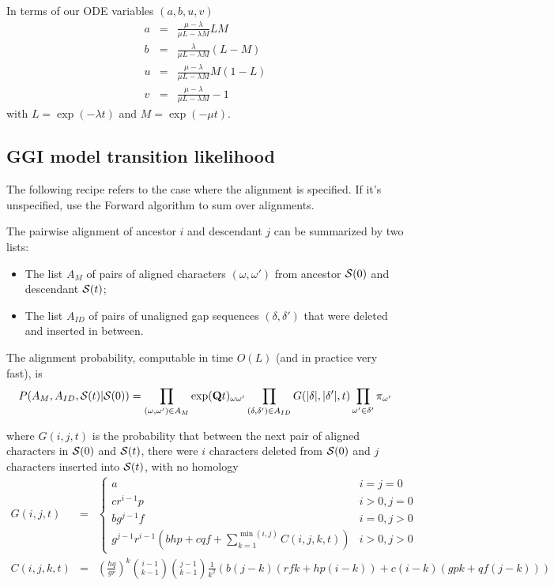 \documentclass{article}
\begin{document}
In terms of our ODE variables $(a,b,u,v)$
\begin{eqnarray*}
  a & = & \frac{\mu - \lambda}{\mu L - \lambda M} LM \\
  b & = & \frac{\lambda}{\mu L - \lambda M} (L - M) \\
  u & = & \frac{\mu - \lambda}{\mu L - \lambda M} M(1-L) \\
  v & = & \frac{\mu - \lambda}{\mu L - \lambda M} - 1
\end{eqnarray*}
with $L=\exp(-\lambda t)$ and $M=\exp(-\mu t)$.


\subsection{GGI model transition likelihood}

The following recipe refers to the case where the alignment is specified.
If it's unspecified, use the Forward algorithm to sum over alignments.

The pairwise alignment of ancestor $i$ and descendant $j$ can be summarized by two lists:
\begin{itemize}
    \item The list $A_M$ of pairs of aligned characters $(\omega,\omega')$ from ancestor ${\cal S}(0)$ and descendant ${\cal S}(t)$;
    \item The list $A_{ID}$ of pairs of unaligned gap sequences $(\delta,\delta')$ that were deleted and inserted in between.
\end{itemize}

The alignment probability, computable in time $O(L)$ (and in practice very fast), is
\[
P(A_M,A_{ID},{\cal S}(t)|{\cal S}(0)) =
\prod_{(\omega,\omega') \in A_M} \exp({\bf Q}t)_{\omega \omega'}
\prod_{(\delta,\delta') \in A_{ID}} G(|\delta|,|\delta'|,t)
\prod_{\omega'\in \delta'} \pi_{\omega'}
\]

where $G(i,j,t)$ is the probability that between the next pair of aligned characters in ${\cal S}(0)$ and ${\cal S}(t)$,
there were $i$ characters deleted from ${\cal S}(0)$ 
and $j$ characters inserted into ${\cal S}(t)$,
with no homology
\begin{eqnarray*}
G(i,j,t) & = &
\left\{ \begin{array}{ll}
a & i=j=0 \\
cr^{i-1}p & i>0, j=0 \\
bg^{j-1}f & i=0, j>0 \\
\displaystyle
g^{j-1} r^{i-1}
\left(
bhp + cqf +
\sum_{k=1}^{\min(i,j)} C(i,j,k,t)
\right)
& i>0, j>0
\end{array} \right.
\\
C(i,j,k,t) & = &
\left( \frac{hq}{gr} \right)^k
\binom{i-1}{k-1} \binom{j-1}{k-1} \frac{1}{k^2}
\left( b(j-k)(rfk + hp(i-k)) + c(i-k)(gpk + qf(j-k)) \right)
\end{eqnarray*}
\end{document}
